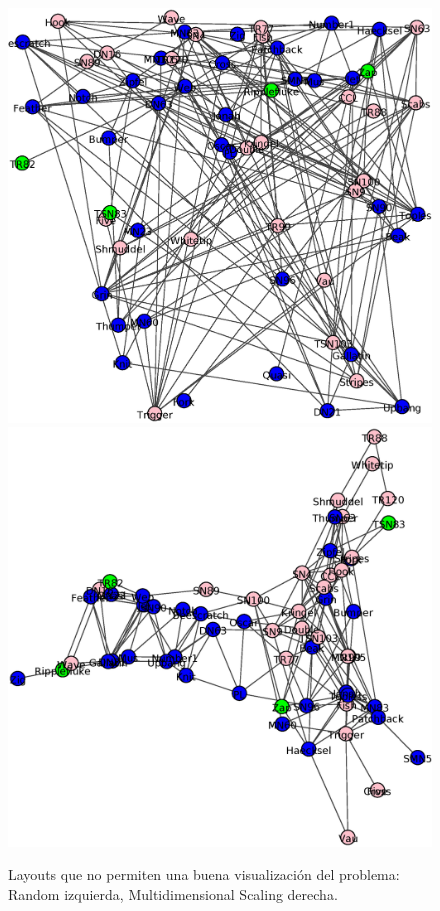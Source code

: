 \begin{figure}
\centering
\includegraphics[scale = 0.25]{figuras/Random.eps}
\includegraphics[scale = 0.25]{figuras/Multi.eps}
\caption{Layouts que no permiten una buena visualización del problema: Random izquierda, Multidimensional Scaling derecha.}
\label{fig:Layouts_malos}
\end{figure}


